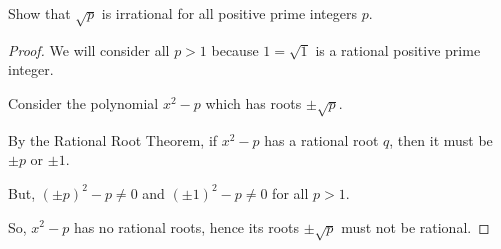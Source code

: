 \documentclass[../hw6]{subfiles}
\begin{document}
\begin{problem}
Show that $\sqrt{p}$ is irrational for all positive prime integers $p$.
\end{problem}
\begin{proof}
	We will consider all $p>1$ because  $1=\sqrt{1}$ is a rational positive prime integer.

	Consider the polynomial $x^2-p$ which has roots $ \pm \sqrt{p} $.

	By the Rational Root Theorem,
	if $x^2-p$ has a rational root $q$, then it must be $ \pm p$ or $ \pm 1$.

	But, $( \pm p)^2-p \neq 0$ and $ ( \pm 1)^2-p\neq 0$ for all $p>1$.

	So,  $x^2-p$ has no rational roots,
	hence its roots $ \pm \sqrt{p} $ must not be rational.
\end{proof}
\end{document}
